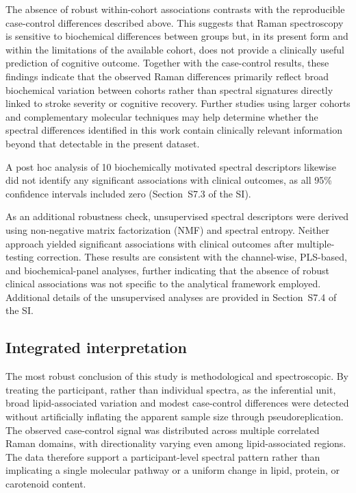 \documentclass[preprint,12pt]{elsarticle}
\begin{document}
The absence of robust within-cohort associations contrasts with the reproducible case-control differences described above. This suggests that Raman spectroscopy is sensitive to biochemical differences between groups but, in its present form and within the limitations of the available cohort, does not provide a clinically useful prediction of cognitive outcome. Together with the case-control results, these findings indicate that the observed Raman differences primarily reflect broad biochemical variation between cohorts rather than spectral signatures directly linked to stroke severity or cognitive recovery. Further studies using larger cohorts and complementary molecular techniques may help determine whether the spectral differences identified in this work contain clinically relevant information beyond that detectable in the present dataset.

A post hoc analysis of 10 biochemically motivated spectral descriptors likewise did not identify any significant associations with clinical outcomes, as all 95\% confidence intervals included zero (Section~S7.3 of the SI).

As an additional robustness check, unsupervised spectral descriptors were derived using non-negative matrix factorization (NMF) and spectral entropy. Neither approach yielded significant associations with clinical outcomes after multiple-testing correction. These results are consistent with the channel-wise, PLS-based, and biochemical-panel analyses, further indicating that the absence of robust clinical associations was not specific to the analytical framework employed. Additional details of the unsupervised analyses are provided in Section~S7.4 of the SI.


\subsection{Integrated interpretation} 
\label{subsec:interpretation}

The most robust conclusion of this study is methodological and spectroscopic. By treating the participant, rather than individual spectra, as the inferential unit, broad lipid-associated variation and modest case-control differences were detected without artificially inflating the apparent sample size through pseudoreplication. The observed case-control signal was distributed across multiple correlated Raman domains, with directionality varying even among lipid-associated regions. The data therefore support a participant-level spectral pattern rather than implicating a single molecular pathway or a uniform change in lipid, protein, or carotenoid content.
\end{document}

